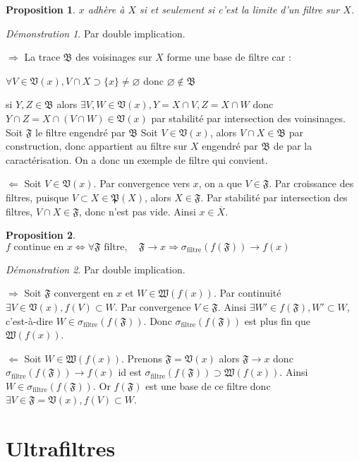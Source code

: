 \documentclass[a4paper, 11pt, french]{book}
\newenvironment{itemise}{\itemize}{\enditemize}
\theoremstyle{plain} %
\newtheorem{proposition}{Proposition}
\theoremstyle{definition} %
\theoremstyle{remark} %
\newtheorem*{demonstration}{Démonstration}
\newcommand{\1}{\mathds{1}}
\newcommand\vide{\varnothing}
\renewcommand{\frak}[1]{\mathfrak{#1}}
\renewcommand{\rm}[1]{\mathrm{#1}}
\newcommand\equivalence[3]{
	\begin{demonstration}
		#1
		\begin{itemise}
			\item[$\Longrightarrow$] #2
			\item[$\Longleftarrow$] #3
		\end{itemise}
	\end{demonstration}
}
\begin{document}
\begin{proposition}
	$x$ adhère à $X$ si et seulement si c'est la limite d'un filtre sur $X$.
\end{proposition}

\equivalence{Par double implication.}{
	La trace $\frak{B}$ des voisinages sur $X$ forme une base de filtre car :
		\begin{itemise}
			\item $\forall V\in\frak{V}(x), V\cap X\supset\{x\}\neq\vide$ donc $\vide\notin\frak{B}$
			\item si $Y, Z\in\frak{B}$ alors $\exists V, W\in\frak{V}(x), Y=X\cap V, Z=X\cap W$ donc $Y\cap Z=X\cap(V\cap W)\in\frak{V}(x)$ par stabilité par intersection des voinsinages.
		\end{itemise}
		Soit $\frak{F}$ le filtre engendré par $\frak{B}$
		Soit $V\in\frak{V}(x)$, alors $V\cap X\in\frak{B}$ par construction, donc appartient au filtre sur $X$ engendré par $\frak{B}$ de par la caractérisation.
		On a donc un exemple de filtre qui convient.
}{
	Soit $V\in\frak{V}(x)$.
		Par convergence vers $x$, on a que $V\in\frak{F}$.
		Par croissance des filtres, puisque $V\subset X\in\frak{P}(X)$, alors $X\in\frak{F}$.
		Par stabilité par intersection des filtres, $V\cap X\in\frak{F}$, donc n'est pas vide.
		Ainsi $x\in\overline{X}$.
}

\begin{proposition}
	$f\text{ continue en }x\iff\forall\frak{F}\text{ filtre},\quad\frak{F}\rightarrow x\Rightarrow\sigma_\rm{filtre}(f(\frak{F}))\rightarrow f(x)$
\end{proposition}

\equivalence{Par double implication.}{
	Soit $\frak{F}$ convergent en $x$ et $W\in\frak{W}(f(x))$.
		Par continuité $\exists V\in\frak{V}(x), f(V)\subset W$.
		Par convergence $V\in\frak{F}$.
		Ainsi $\exists W'\in f(\frak{F}), W'\subset W$, c'est-à-dire $W\in\sigma_\rm{filtre}(f(\frak{F}))$.
		Donc $\sigma_\rm{filtre}(f(\frak{F}))$ est plus fin que $\frak{W}(f(x))$.
}{
	Soit $W\in\frak{W}(f(x))$.
		Prenons $\frak{F}=\frak{V}(x)$ alors $\frak{F}\rightarrow x$ donc $\sigma_\rm{filtre}(f(\frak{F}))\rightarrow f(x)$ id est $\sigma_\rm{filtre}(f(\frak{F}))\supset\frak{W}(f(x))$.
		Ainsi $W\in\sigma_\rm{filtre}(f(\frak{F}))$.
		Or $f(\frak{F})$ est une base de ce filtre donc $\exists V\in\frak{F}=\frak{V}(x), f(V)\subset W$.
}

\section{Ultrafiltres}
\end{document}

